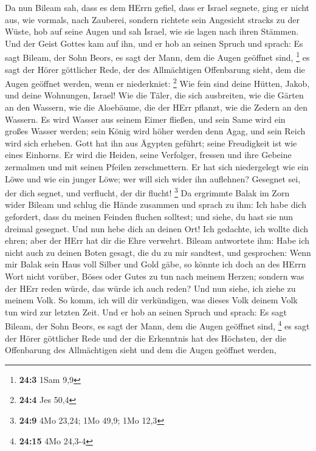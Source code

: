  Da nun Bileam sah, dass es dem HErrn gefiel, dass er
Israel segnete, ging er nicht aus, wie vormals, nach Zauberei, sondern
richtete sein Angesicht stracks zu der Wüste,  hob auf
seine Augen und sah Israel, wie sie lagen nach ihren Stämmen. Und der
Geist Gottes kam auf ihn,  und er hob an seinen Spruch und
sprach: Es sagt Bileam, der Sohn Beors, es sagt der Mann, dem die Augen
geöffnet sind, \footnote{\textbf{24:3} 1Sam 9,9}  es sagt
der Hörer göttlicher Rede, der des Allmächtigen Offenbarung sieht, dem
die Augen geöffnet werden, wenn er niederkniet: \footnote{\textbf{24:4}
  Jes 50,4}  Wie fein sind deine Hütten, Jakob, und deine
Wohnungen, Israel!  Wie die Täler, die sich ausbreiten,
wie die Gärten an den Wassern, wie die Aloebäume, die der HErr pflanzt,
wie die Zedern an den Wassern.  Es wird Wasser aus seinem
Eimer fließen, und sein Same wird ein großes Wasser werden; sein König
wird höher werden denn Agag, und sein Reich wird sich erheben.
 Gott hat ihn aus Ägypten geführt; seine Freudigkeit ist
wie eines Einhorns. Er wird die Heiden, seine Verfolger, fressen und
ihre Gebeine zermalmen und mit seinen Pfeilen zerschmettern.
 Er hat sich niedergelegt wie ein Löwe und wie ein junger
Löwe; wer will sich wider ihn auflehnen? Gesegnet sei, der dich segnet,
und verflucht, der dir flucht! \footnote{\textbf{24:9} 4Mo 23,24; 1Mo
  49,9; 1Mo 12,3}  Da ergrimmte Balak im Zorn wider
Bileam und schlug die Hände zusammen und sprach zu ihm: Ich habe dich
gefordert, dass du meinen Feinden fluchen solltest; und siehe, du hast
sie nun dreimal gesegnet.  Und nun hebe dich an deinen
Ort! Ich gedachte, ich wollte dich ehren; aber der HErr hat dir die Ehre
verwehrt.  Bileam antwortete ihm: Habe ich nicht auch zu
deinen Boten gesagt, die du zu mir sandtest, und gesprochen:
 Wenn mir Balak sein Haus voll Silber und Gold gäbe, so
könnte ich doch an des HErrn Wort nicht vorüber, Böses oder Gutes zu tun
nach meinem Herzen; sondern was der HErr reden würde, das würde ich auch
reden?  Und nun siehe, ich ziehe zu meinem Volk. So komm,
ich will dir verkündigen, was dieses Volk deinem Volk tun wird zur
letzten Zeit.  Und er hob an seinen Spruch und sprach: Es
sagt Bileam, der Sohn Beors, es sagt der Mann, dem die Augen geöffnet
sind, \footnote{\textbf{24:15} 4Mo 24,3-4}  es sagt der
Hörer göttlicher Rede und der die Erkenntnis hat des Höchsten, der die
Offenbarung des Allmächtigen sieht und dem die Augen geöffnet werden,

